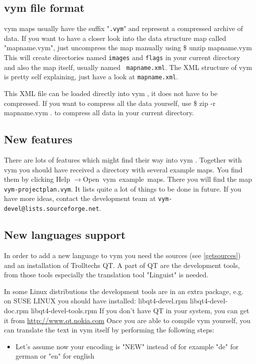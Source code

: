 \documentclass[12pt,a4paper]{article}
\newcommand{\vym}{{\sc vym }}
\newcommand{\ra}{$\longrightarrow$}
\newenvironment{code}[1] { \verbatim #1}{\endverbatim  }
\begin{document}
\begin{appendix}

\subsection{\vym file format} \label{fileformat}
\vym maps usually have the suffix "{\tt .vym}" and represent a
compressed archive of data. If you want to have a closer look into the
data structure map called "mapname.vym", just uncompress the map
manually using
\begin{code}
\$ unzip mapname.vym
\end{code}
This will create directories named {\tt images} and {\tt flags} in your
current directory and also the map itself, usually named {\tt
mapname.xml}.  The XML structure of \vym is pretty self explaining, just
have a look at {\tt mapname.xml}.

This XML file can be loaded directly into \vym, it does not have to be
compressed. If you want to compress all the data yourself, use
\begin{code}
\$ zip -r mapname.vym .
\end{code}
to compress all data in your current directory.

\subsection{New features}
There are lots of features which might find their way into \vym.
Together with \vym you should have received a directory with several
example maps. You find them by clicking Help \ra Open~vym~example~maps.
There you will find the map {\tt vym-projectplan.vym}. It lists quite a
lot of things to be done in future. If you have more ideas, contact the
development team at {\tt vym-devel@lists.sourceforge.net}.


\subsection{New languages support}
In order to add a new language to \vym you need the sources (see
\ref{getsources}) and an installation of Trolltechs QT. A part of QT are
the development tools, from those tools especially the translation tool
"Linguist" is needed. 

In some Linux distributions the development tools are in an extra
package, e.g. on SUSE LINUX you should have installed:
\begin{code}
libqt4-devel.rpm
libqt4-devel-doc.rpm
libqt4-devel-tools.rpm
\end{code}
If you don't have QT in your system, you can get it from 
    \href{http://www.qt.nokia.com}{http://www.qt.nokia.com} Once you
    are able to compile vym yourself, you can translate the text in vym
    itself by performing the following steps:
\begin{itemize}
    \item Let's assume now your encoding is "NEW" instead of for example
    "de" for german or "en" for english
    

\end{itemize}
\end{appendix}
\end{document}
